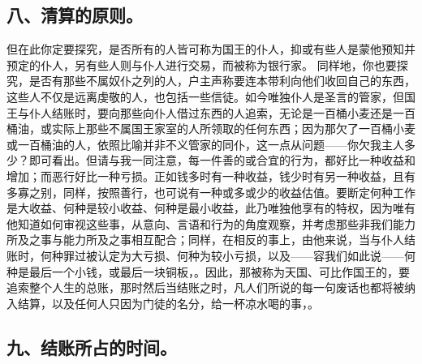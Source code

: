 
\subsection{八、清算的原则。}

但在此你定要探究，是否所有的人皆可称为国王的仆人，抑或有些人是蒙他预知并预定的仆人，另有些人则与仆人进行交易，而被称为银行家。 同样地，你也要探究，是否有那些不属奴仆之列的人，户主声称要连本带利向他们收回自己的东西，这些人不仅是远离虔敬的人，也包括一些信徒。如今唯独仆人是圣言的管家，但国王与仆人结账时，要向那些向仆人借过东西的人追索，无论是一百桶小麦还是一百桶油，或实际上那些不属国王家室的人所领取的任何东西；因为那欠了一百桶小麦或一百桶油的人，依照比喻并非不义管家的同仆，这一点从问题——你欠我主人多少？即可看出。但请与我一同注意，每一件善的或合宜的行为，都好比一种收益和增加；而恶行好比一种亏损。正如钱多时有一种收益，钱少时有另一种收益，且有多寡之别，同样，按照善行，也可说有一种或多或少的收益估值。要断定何种工作是大收益、何种是较小收益、何种是最小收益，此乃唯独他享有的特权，因为唯有他知道如何审视这些事，从意向、言语和行为的角度观察，并考虑那些非我们能力所及之事与能力所及之事相互配合；同样，在相反的事上，由他来说，当与仆人结账时，何种罪过被认定为大亏损、何种为较小亏损，以及——容我们如此说——何种是最后一个小钱，或最后一块铜板，。因此，那被称为天国、可比作国王的，要追索整个人生的总账，那时然后当结账之时，凡人们所说的每一句废话也都将被纳入结算，以及任何人只因为门徒的名分，给一杯凉水喝的事，。\par


\subsection{九、结账所占的时间。}

